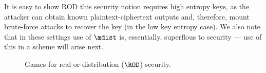 It is easy to show ROD this security notion requires high entropy keys, as the
attacker can obtain known plaintext-ciphertext outputs and, therefore, mount
brute-force attacks to recover the key (in the low key entropy case). We also
note that in these settings use of $\mdist$ is, essentially, superflous to
security --- use of this in a scheme will arise next.  

\begin{figure}[t]
\center
{}
\caption{Games for real-or-distribution ($\ROD$) security.}
\label{sec:rod-security-games}
\end{figure}

